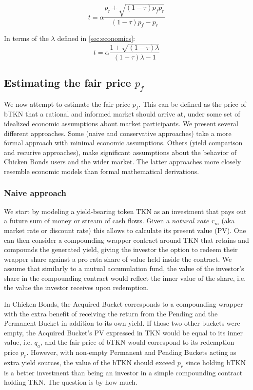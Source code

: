 \documentclass{article}
\begin{document}
\begin{equation}
  \label{eq:optimal_chicken_in_1_fee}
t = \alpha \frac{p_r + \sqrt{(1-\tau)p_f p_r}}{(1-\tau)p_f-p_r}
\end{equation}

In terms of the $\lambda$ defined in \ref{sec:economics}:
\begin{equation}
  \label{eq:optimal_chicken_in_2_fee}
t = \alpha \frac{1 + \sqrt{(1-\tau)\lambda}}{(1-\tau)\lambda - 1}
\end{equation}

\subsection{Estimating the fair price $p_f$}
We now attempt to estimate the fair price $p_f$. This can be defined as the price of bTKN that a rational and informed market should arrive at, under some set of idealized economic assumptions about market participants. We present several different approaches. Some (naive and conservative approaches) take a more formal approach with minimal economic assumptions. Others (yield comparison and recurive approaches), make significant assumptions about the behavior of Chicken Bonds users and the wider market. The latter approaches more closely resemble economic models than formal mathematical derivations.

\subsubsection{Naive approach}
We start by modeling a yield-bearing token TKN as an investment that pays out a future sum of money or stream of cash flows. Given a $\textit{natural rate}$ $r_m$ (aka market rate or discount rate) this allows to calculate its present value (PV). One can then consider a compounding wrapper contract around TKN that retains and compounds the generated yield, giving the investor the option to redeem their wrapper share against a pro rata share of value held inside the contract. We assume that similarly to a mutual accumulation fund, the value of the investor's share in the compounding contract would reflect the inner value of the share, i.e. the value the investor receives upon redemption. 

In Chicken Bonds, the Acquired Bucket corresponds to a compounding wrapper with the extra benefit of receiving the return from the Pending and the Permanent Bucket in addition to its own yield. If those two other buckets were empty, the Acquired Bucket's PV expressed in TKN would be equal to its inner value, i.e. $q_a$, and the fair price of bTKN would correspond to its redemption price $p_r$. However, with non-empty Permanent and Pending Buckets acting as extra yield sources, the value of the bTKN should exceed $p_r$ since holding bTKN is a better investment than being an investor in a simple compounding contract holding TKN. The question is by how much.
\end{document}
